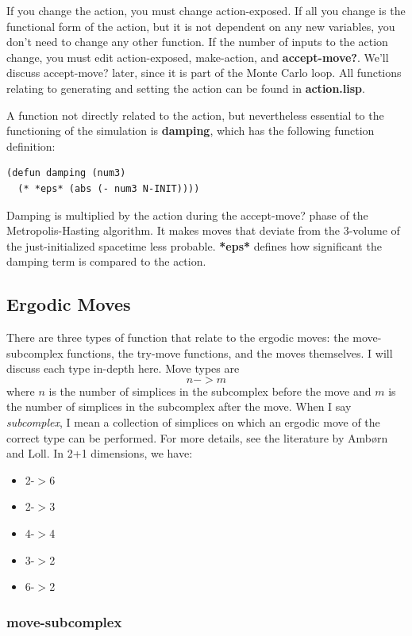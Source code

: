\documentclass[12pt]{article}
\begin{document}
If you change the action, you must change action-exposed. If all you
change is the functional form of the action, but it is not dependent
on any new variables, you don't need to change any other function. If
the number of inputs to the action change, you must edit
action-exposed, make-action, and \textbf{accept-move?}. We'll discuss
accept-move? later, since it is part of the Monte Carlo loop. All
functions relating to generating and setting the action can be found
in \textbf{action.lisp}.

A function not directly related to the action, but nevertheless
essential to the functioning of the simulation is \textbf{damping},
which has the following function definition:
\begin{lstlisting}
(defun damping (num3)
  (* *eps* (abs (- num3 N-INIT))))
\end{lstlisting}
Damping is multiplied by the action during the accept-move? phase of
the Metropolis-Hasting algorithm. It makes moves that deviate from the
3-volume of the just-initialized spacetime less
probable. \textbf{*eps*} defines how significant the damping term is
compared to the action.

\subsection{Ergodic Moves}
There are three types of function that relate to the ergodic moves:
the move-subcomplex functions, the try-move functions, and the moves
themselves. I will discuss each type in-depth here. Move types are 
$$n->m$$
where $n$ is the number of simplices in the subcomplex before the move
and $m$ is the number of simplices in the subcomplex after the
move. When I say \textit{subcomplex}, I mean a collection of simplices
on which an ergodic move of the correct type can be performed. For
more details, see the literature by Amb\o rn and Loll. In 2+1
dimensions, we have:
\begin{itemize}
\item 2-$>$6
\item 2-$>$3
\item 4-$>$4
\item 3-$>$2
\item 6-$>$2
\end{itemize}

\subsubsection{move-subcomplex}
\end{document}
